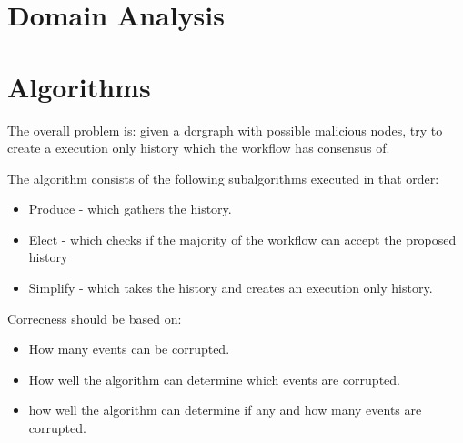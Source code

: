 \chapter{Domain Analysis}
\label{chap:domainanalysis}

\chapter{Algorithms}
The overall problem is: given a dcrgraph with possible malicious nodes, try to create a execution only history which the workflow has consensus of.

The algorithm consists of the following subalgorithms executed in that order:
\begin{itemize}
    \item Produce - which gathers the history.
    \item Elect - which checks if the majority of the workflow can accept the proposed history
    \item Simplify - which takes the history and creates an execution only history.
\end{itemize}

Correcness should be based on:
\begin{itemize}
    \item How many events can be corrupted.
    \item How well the algorithm can determine which events are corrupted.
    \item how well the algorithm can determine if any and how many events are corrupted.
\end{itemize}








